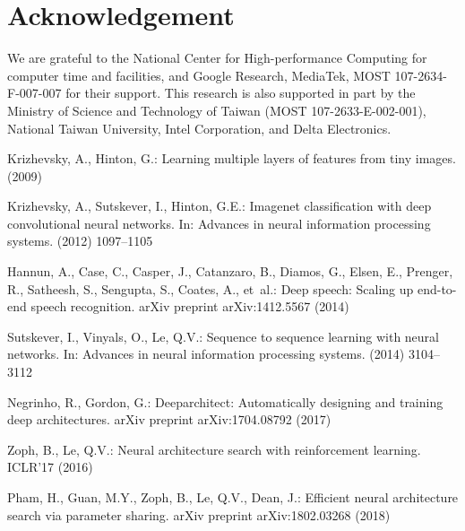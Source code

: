 \documentclass[runningheads]{llncs}
\begin{document}
\section{Acknowledgement}
We are grateful to the National Center for High-performance Computing for computer time and facilities, and Google Research, MediaTek, MOST 107-2634-F-007-007 for their support. This research is also supported in part by the Ministry of Science and Technology of Taiwan (MOST 107-2633-E-002-001), National Taiwan University, Intel Corporation, and Delta Electronics.

%
%
%
% 
% 
%
\begin{thebibliography}{10}

Krizhevsky, A., Hinton, G.:
\newblock Learning multiple layers of features from tiny images.
\newblock (2009)

Krizhevsky, A., Sutskever, I., Hinton, G.E.:
\newblock Imagenet classification with deep convolutional neural networks.
\newblock In: Advances in neural information processing systems. (2012)
  1097--1105

Hannun, A., Case, C., Casper, J., Catanzaro, B., Diamos, G., Elsen, E.,
  Prenger, R., Satheesh, S., Sengupta, S., Coates, A.,  et~al.:
\newblock Deep speech: Scaling up end-to-end speech recognition.
\newblock arXiv preprint arXiv:1412.5567 (2014)

Sutskever, I., Vinyals, O., Le, Q.V.:
\newblock Sequence to sequence learning with neural networks.
\newblock In: Advances in neural information processing systems. (2014)
  3104--3112

Negrinho, R., Gordon, G.:
\newblock Deeparchitect: Automatically designing and training deep
  architectures.
\newblock arXiv preprint arXiv:1704.08792 (2017)

Zoph, B., Le, Q.V.:
\newblock Neural architecture search with reinforcement learning.
\newblock ICLR'17 (2016)

Pham, H., Guan, M.Y., Zoph, B., Le, Q.V., Dean, J.:
\newblock Efficient neural architecture search via parameter sharing.
\newblock arXiv preprint arXiv:1802.03268 (2018)


\end{thebibliography}
\end{document}
